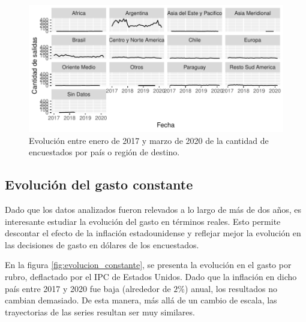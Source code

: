 \documentclass[
]{article}
\begin{document}
\begin{figure}[H]

{\centering \includegraphics{Informe-Proyectofinal_files/figure-latex/lineas_destino-1} 

}

\caption{Evolución entre enero de 2017 y marzo de 2020 de la cantidad de encuestados por país o región de destino.}\label{fig:lineas_destino}
\end{figure}

\hypertarget{evoluciuxf3n-del-gasto-constante}{%
\subsection{Evolución del gasto
constante}\label{evoluciuxf3n-del-gasto-constante}}

Dado que los datos analizados fueron relevados a lo largo de más de dos
años, es interesante estudiar la evolución del gasto en términos reales.
Esto permite descontar el efecto de la inflación estadounidense y
reflejar mejor la evolución en las decisiones de gasto en dólares de los
encuestados.

En la figura \ref{fig:evolucion_constante}, se presenta la evolución en
el gasto por rubro, deflactado por el IPC de Estados Unidos. Dado que la
inflación en dicho país entre 2017 y 2020 fue baja (alrededor de
\(2\%\)) anual, los resultados no cambian demasiado. De esta manera, más
allá de un cambio de escala, las trayectorias de las series resultan ser
muy similares.
\end{document}
